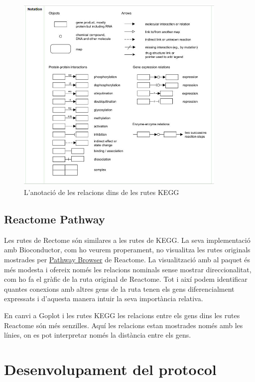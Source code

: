 \begin{figure}[H]
\centering
\includegraphics[width=0.9\textwidth]{figures/Annotation_KEGG.jpg} 
\caption{L'anotació de les relacions dins de les rutes \gls{KEGG}}
\end{figure}

\subsection{Reactome Pathway}

Les rutes de Rectome són similares a les rutes de \gls{KEGG}. La seva implementació amb \gls{Bioconductor}, com ho veurem properament, no visualitza les rutes originals mostrades per \href{https://reactome.org/PathwayBrowser/}{Pathway Browser} de Reactome. La visualització amb al paquet  és més modesta i ofereix només les relacions nominals sense mostrar direccionalitat, com ho fa el gràfic de la ruta original de Reactome. Tot i així podem identificar quantes conexions amb altres gens de la ruta tenen els gens diferencialment expressats i d'aquesta manera intuir la seva importància relativa. 

En canvi a Goplot i les rutes \gls{KEGG} les relacions entre els gens dins les rutes Reactome són més senzilles. Aquí les relacions estan mostrades només amb les línies, on es pot interpretar només la distància entre els gens. 

\section{Desenvolupament del protocol}


